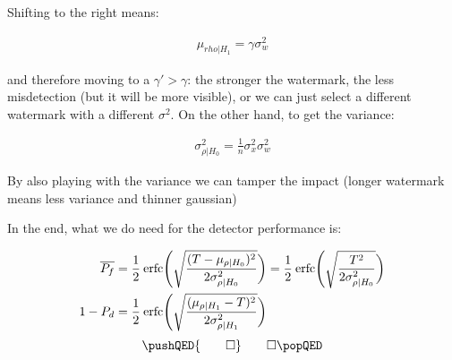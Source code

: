 \documentclass[a4paper,11pt,hidelinks]{article}
\begin{document}
Shifting to the right means:

\begin{align}
    \mu_{rho|H_1} = \gamma \sigma_w^2
\end{align}

and therefore moving to a $\gamma' > \gamma$: the stronger the watermark, the less misdetection (but it will be more visible), or we can just select a different watermark with a different $\sigma^2$. On the other hand, to get the variance:

\begin{align}
    \sigma^2_{\rho|H_0} = \frac{1}{n} \sigma_x^2 \sigma_w^2
\end{align}

By also playing with the variance we can tamper the impact (longer watermark means less variance and thinner gaussian)

In the end, what we do need for the detector performance is:

\begin{align}
    \overline{P_f} & = \frac{1}{2} \:\text{erfc}\Bigg{(}\sqrt{\frac{(T - \mu_{\rho|H_0})^2}{2 \sigma^2_{\rho|H_0}}}\bigg{)} = \frac{1}{2} \:\text{erfc}\Bigg{(}\sqrt{\frac{T^2}{2 \sigma^2_{\rho|H_0}}}\bigg{)} \\
    1 - P_d & = \frac{1}{2} \:\text{erfc}\Bigg{(}\sqrt{\frac{(\mu_{\rho|H_1} - T)^2}{2 \sigma^2_{\rho|H_1}}}\bigg{)}
\end{align}
\[
    \pushQED{\qed}
    \qedhere
    \popQED
\]
\endgroup
\end{document}
